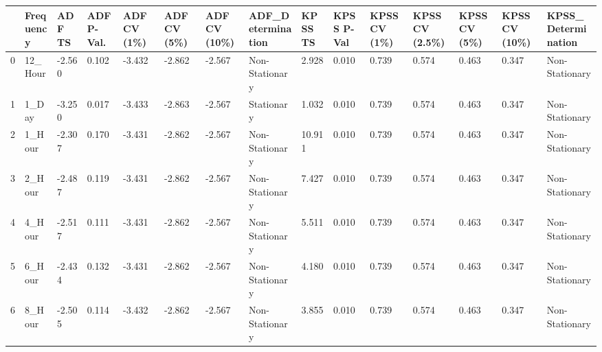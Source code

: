 \begin{tabular}{lllllllllllllll}
\toprule
 & Frequency & ADF TS & ADF P-Val. & ADF CV (1\%) & ADF CV (5\%) & ADF CV (10\%) & ADF_Determination & KPSS TS & KPSS P-Val & KPSS CV (1\%) & KPSS CV (2.5\%) & KPSS CV (5\%) & KPSS CV (10\%) & KPSS_Determination \\
\midrule
0 & 12_Hour & -2.560 & 0.102 & -3.432 & -2.862 & -2.567 & Non-Stationary & 2.928 & 0.010 & 0.739 & 0.574 & 0.463 & 0.347 & Non-Stationary \\
1 & 1_Day & -3.250 & 0.017 & -3.433 & -2.863 & -2.567 & Stationary & 1.032 & 0.010 & 0.739 & 0.574 & 0.463 & 0.347 & Non-Stationary \\
2 & 1_Hour & -2.307 & 0.170 & -3.431 & -2.862 & -2.567 & Non-Stationary & 10.911 & 0.010 & 0.739 & 0.574 & 0.463 & 0.347 & Non-Stationary \\
3 & 2_Hour & -2.487 & 0.119 & -3.431 & -2.862 & -2.567 & Non-Stationary & 7.427 & 0.010 & 0.739 & 0.574 & 0.463 & 0.347 & Non-Stationary \\
4 & 4_Hour & -2.517 & 0.111 & -3.431 & -2.862 & -2.567 & Non-Stationary & 5.511 & 0.010 & 0.739 & 0.574 & 0.463 & 0.347 & Non-Stationary \\
5 & 6_Hour & -2.434 & 0.132 & -3.431 & -2.862 & -2.567 & Non-Stationary & 4.180 & 0.010 & 0.739 & 0.574 & 0.463 & 0.347 & Non-Stationary \\
6 & 8_Hour & -2.505 & 0.114 & -3.432 & -2.862 & -2.567 & Non-Stationary & 3.855 & 0.010 & 0.739 & 0.574 & 0.463 & 0.347 & Non-Stationary \\
\bottomrule
\end{tabular}
